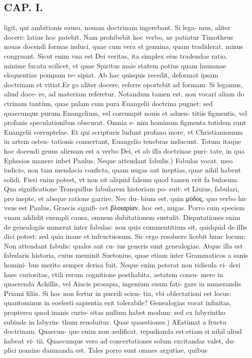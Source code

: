 \documentclass{article}
\begin{document}
\begin{pages}
\section*{CAP. I. }
\marginpar{[ p.3]}\pstart ligit, qui ambitionis eausa, nouam doctrinam ingerebant. Si lega- mus, aliter docere: latius hoc patebit. Nam prohibebit hoc verbo, ne patiatur Timotheus nouas docendi formas induci, quae cum vera et genuina, quam tradiderat, minus congruant. Sicut enim vna est Dei veritas, ita simplex eius tradendae ratio, minime fucata scilicet, et quae Spiritus maie statem potius quam humanae eloquentiae pompam re- sipiat. Ab hac quisquis recedit, deformat ipsam doctrinam et vitiat.Er go aliter docere, referre oportebit ad formam. Si legamus, aliud doce- re, ad materiam referetur. Notandum tamen est, non vocari aliam do ctrinam tantùm, quae palam cum pura Euangelii doctrina pugnet: sed quaecunque purum Euangelium, vel corrumpit nouis et aduen- titiis figmentis, vel profanis speculationibus obscurat. Omnia e- nim hominum figmenta totidem sunt Euangelii corruptelae. Et qui scripturis ludunt profano more, vt Christianismum in artem osten- tationis conuertant, Euangelio tenebras inducunt. Totum itaque hoc docendi genus alienum est a verbo Dei, et ab illa doctrinae puri- tate, in qua Ephesios manere iubet Paulus.  \pend\pstart Neque attendant fabulis.) Fabulas vocat, meo iudicio, non tam mendacia conficta, quam nugas aut ineptias, quae nihil habent solidi. Fieri enim potest, vt non sit aliquid falsum quod tamen erit fa bulosum. Qua significatione Tranquillus fabularem historiam po- suit: et Liuius, fabulari, pro inepte, et absque ratione garrire. Nec du- bium est, quin μύδος, quo verbo hic vsus est Paulus, Graecis signifi- cet βλοιαρίαν. hoc est, nugas. Porro cum speciem vnam addidit exempli causa, omnem dubitationem sustulit. Disputationes enim de genealogiis numerat inter fabulas: non quia commentitium sit, quidquid de illis dici potest: sed quia inane et infructuosum. Sic ergo resoluere licebit hunc locum: Non attendant fabulis: quales aut cu- ius generis sunt genealogiae. Atque illa est fabularis historia, cuius meminit Suetonius, quae etiam inter Grammaticos a sanis homini- bus merito semper derisa fuit. Neque enim poterat non ridieula vi- deri haec curiositas, vtili rerum cognitione posthabita, aetatem consu- mere in quaerenda Achillis, vel Aiacis prosapia, ingenium suum fati- gare in numerandis Priami filiis. Si hoc non fertur in puerili scien- tia, vbi oblectationi est locus: quantominus in eoelesti sapientia erit tolerabile? Genealogias vocat infinitas, propterea quod inanis curio- sitas nullum habet modum: sed ex labyrintho subinde in labyrin- thum reuoluitur.  \pend\pstart Quae quaestiones.) AEstimat a fructu doctrinam. Quaecun- que enim non aedificat, repudianda est:etiam si nihil aliud habeat vi- tii. Quaecunque vero ad concertationes solum excitandas valet, du- plici nomine damnanda est. Tales porro sunt omnes argutiae, quibus  \pend

\end{pages}
\end{document}
